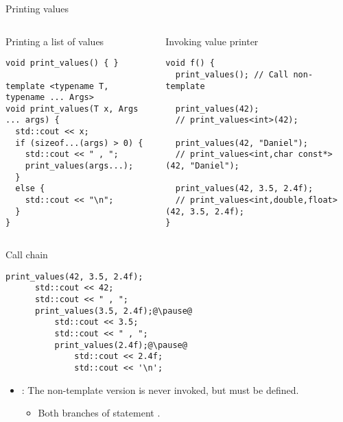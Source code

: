 \begin{frame}[t,fragile]{Printing values}

\begin{columns}[T]

\begin{block}{Printing a list of values}
\begin{lstlisting}
void print_values() { }

template <typename T, typename ... Args>
void print_values(T x, Args ... args) {
  std::cout << x;
  if (sizeof...(args) > 0) {
    std::cout << " , ";
    print_values(args...);
  }
  else {
    std::cout << "\n";
  }
}
\end{lstlisting}
\end{block}

\begin{block}{Invoking value printer}
\begin{lstlisting}
void f() {
  print_values(); // Call non-template

  print_values(42);
  // print_values<int>(42);

  print_values(42, "Daniel");
  // print_values<int,char const*>(42, "Daniel");

  print_values(42, 3.5, 2.4f);
  // print_values<int,double,float>(42, 3.5, 2.4f);
}
\end{lstlisting}
\end{block}

\end{columns}
\end{frame}

\begin{frame}[t,fragile]{Call chain}
\begin{lstlisting}[escapechar=@]
  print_values(42, 3.5, 2.4f);
      std::cout << 42;
      std::cout << " , ";
      print_values(3.5, 2.4f);@\pause@
          std::cout << 3.5;
          std::cout << " , ";
          print_values(2.4f);@\pause@
              std::cout << 2.4f;
              std::cout << '\n';
\end{lstlisting}

\begin{itemize}
  \item {}: The non-template version is never invoked,
        but must be defined.
    \begin{itemize}
      \item Both branches of  statement .
    \end{itemize}
\end{itemize}
\end{frame}
